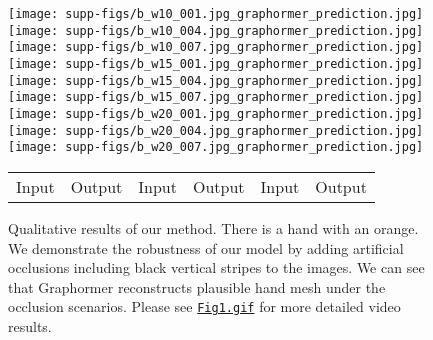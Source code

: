 

\begin{figure*}
\begin{center}
\texttt{[image: supp-figs/b\_w10\_001.jpg\_graphormer\_prediction.jpg]}
\texttt{[image: supp-figs/b\_w10\_004.jpg\_graphormer\_prediction.jpg]}
\texttt{[image: supp-figs/b\_w10\_007.jpg\_graphormer\_prediction.jpg]}
\texttt{[image: supp-figs/b\_w15\_001.jpg\_graphormer\_prediction.jpg]}
\texttt{[image: supp-figs/b\_w15\_004.jpg\_graphormer\_prediction.jpg]}
\texttt{[image: supp-figs/b\_w15\_007.jpg\_graphormer\_prediction.jpg]}
\texttt{[image: supp-figs/b\_w20\_001.jpg\_graphormer\_prediction.jpg]}
\texttt{[image: supp-figs/b\_w20\_004.jpg\_graphormer\_prediction.jpg]}
\texttt{[image: supp-figs/b\_w20\_007.jpg\_graphormer\_prediction.jpg]}
\vspace{-2mm}
\setlength{\tabcolsep}{30pt}
\begin{tabular}{cccccc}
Input & Output &  Input & Output &  Input & Output
\end{tabular}
\caption{
Qualitative results of our method. There is a hand with an orange. We demonstrate the robustness of our model by adding artificial occlusions including black vertical stripes to the images. We can see that Graphormer reconstructs plausible hand mesh under the occlusion scenarios. Please see \href{https://github.com/microsoft/MeshGraphormer/blob/main/docs/Fig1.gif}{\texttt{Fig1.gif}} for more detailed video results.
} 
\label{fig:vis_hand_1}
\end{center}
\end{figure*} 



